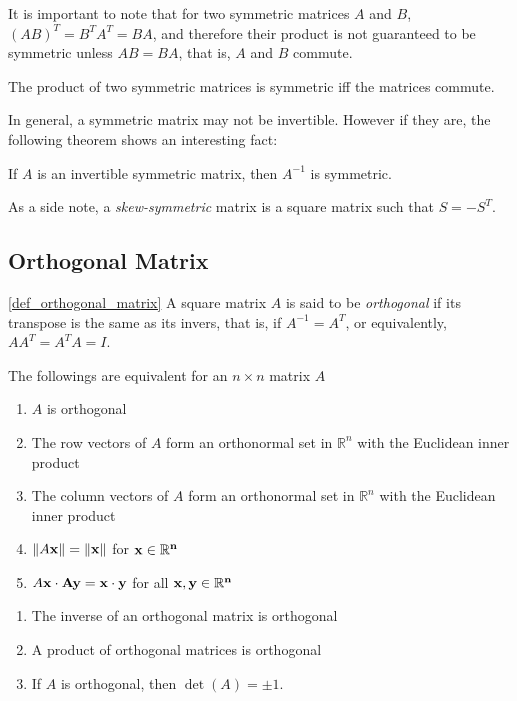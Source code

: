 \documentclass{report}
\begin{document}
		It is important to note that for two symmetric matrices $A$ and $B$, $(AB)^T=B^TA^T=BA$, and therefore their product is not guaranteed to be symmetric unless $AB=BA$, that is, $A$ and $B$ commute.
		
		\begin{thm}
			The product of two symmetric matrices is symmetric iff the matrices commute.
		\end{thm}
		
		In general, a symmetric matrix may not be invertible. However if they are, the following theorem shows an interesting fact:
		
		\begin{thm}
			If $A$ is an invertible symmetric matrix, then $A^{-1}$ is symmetric.
		\end{thm}
		
		As a side note, a \emph{skew-symmetric} matrix is a square matrix such that $S=-S^T$.
		
		\subsection{Orthogonal Matrix}
		\begin{defn}\ref{def_orthogonal_matrix}
			A square matrix $A$ is said to be \emph{orthogonal} if its transpose is the same as its invers, that is, if $A^{-1}=A^T$, or equivalently, $AA^T=A^TA=I$.
		\end{defn}
		
		\begin{thm}
			The followings are equivalent for an $n \times n$ matrix $A$
			\begin{enumerate}
				\item $A$ is orthogonal
				\item The row vectors of $A$ form an orthonormal set in $\mathbb{R}^n$ with the Euclidean inner product
				\item The column vectors of $A$ form an orthonormal set in $\mathbb{R}^n$ with the Euclidean inner product
				\item $\|A\bf{x}\|=\|\bf{x}\|$ for $\bf{x} \in \mathbb{R}^n$
				\item $A\bf{x} \cdot A\bf{y} = \bf{x} \cdot \bf{y}$ for all $\bf{x}, \bf{y} \in \mathbb{R}^n$
			\end{enumerate}
		\end{thm}
		
		\begin{thm}
			\begin{enumerate}
				\item The inverse of an orthogonal matrix is orthogonal
				\item A product of orthogonal matrices is orthogonal
				\item If $A$ is orthogonal, then $\det(A)=\pm 1$.
			\end{enumerate}
		\end{thm}
		
\end{document}
